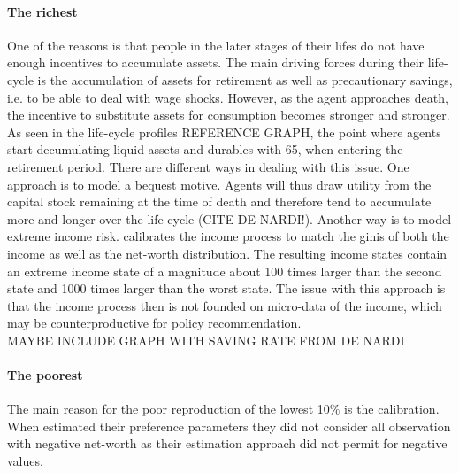 \documentclass[a4paper,12pt,legno]{article}
\begin{document}
\paragraph{The richest}
One of the reasons is that people in the later stages of their lifes do not have enough incentives to accumulate assets. The main driving forces during their life-cycle is the accumulation of assets for retirement as well as precautionary savings, i.e. to be able to deal with wage shocks. However, as the agent approaches death, the incentive to substitute assets for consumption becomes stronger and stronger. As seen in the life-cycle profiles REFERENCE GRAPH, the point where agents start decumulating liquid assets and durables with 65, when entering the retirement period. There are different ways in dealing with this issue. One approach is to model a bequest motive. Agents will thus draw utility from the capital stock remaining at the time of death and therefore tend to accumulate more and longer over the life-cycle (CITE DE NARDI!). Another way is to model extreme income risk. \citep{castaneda2003} calibrates the income process to match the ginis of both the income as well as the net-worth distribution. The resulting income states contain an extreme income state of a magnitude about 100 times larger than the second state and 1000 times larger than the worst state. The issue with this approach is that the income process then is not founded on micro-data of the income, which may be counterproductive for policy recommendation. 
\\
MAYBE INCLUDE GRAPH WITH SAVING RATE FROM DE NARDI
\\
\paragraph{The poorest}
The main reason for the poor reproduction of the lowest 10\% is the calibration. When \cite{hintermaier2011} estimated their preference parameters they did not consider all observation with negative net-worth as their estimation approach did not permit for negative values.
\end{document}
